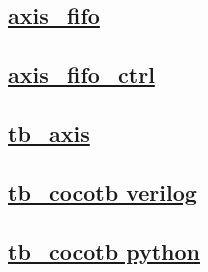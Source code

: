 \documentclass{article}
\begin{document}
  


  \subsection{\href{../files/axis_fifo-v.html}{axis\_fifo}}
  \subsection{\href{../files/axis_fifo_ctrl-v.html}{axis\_fifo\_ctrl}}
  \subsection{\href{../files2/tb_axis-v.html}{tb\_axis}}
  \subsection{\href{../files2/tb_cocotb-v.html}{tb\_cocotb verilog}}
  \subsection{\href{../files2/tb_cocotb-py.html}{tb\_cocotb python}}
\end{document}
